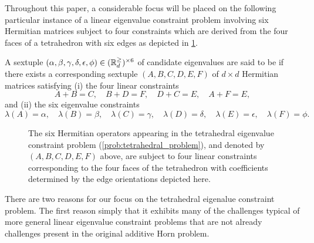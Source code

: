 \documentclass[notitlepage, 10pt]{article}
\begin{document}
Throughout this paper, a considerable focus will be placed on the following particular instance of a linear eigenvalue constraint problem involving six Hermitian matrices subject to four constraints which are derived from the four faces of a tetrahedron with six edges as depicted in \cref{fig:tetrahedron_labelling_scheme}.
\begin{prob}
    \label{prob:tetrahedral_problem}
    A sextuple $(\alpha,\beta,\gamma,\delta,\epsilon,\phi) \in (\mathbb R^{\geq}_{d})^{\times 6}$ of candidate eigenvalues are said to be  if there exists a corresponding sextuple $(A,B,C,D,E,F)$ of $d\times d$ Hermitian matrices satisfying (i) the four linear constraints
    \begin{equation}
        \label{eq:tetrahedral_linear_constraints}
        A + B = C, \quad
        B + D = F, \quad
        D + C = E, \quad
        A + F = E,
    \end{equation}
    and (ii) the six eigenvalue constraints
    \begin{equation}
        \label{eq:tetrahedral_eigenvalue_constraints}
        \lambda(A) = \alpha, \quad
        \lambda(B) = \beta, \quad
        \lambda(C) = \gamma, \quad
        \lambda(D) = \delta, \quad
        \lambda(E) = \epsilon, \quad
        \lambda(F) = \phi.
    \end{equation}
\end{prob}
\begin{center}
    \begin{figure}
        \caption{The six Hermitian operators appearing in the tetrahedral eigenvalue constraint problem (\cref{prob:tetrahedral_problem}), and denoted by $(A,B,C,D,E,F)$ above, are subject to four linear constraints corresponding to the four faces of the tetrahedron with coefficients determined by the edge orientations depicted here.}
        \label{fig:tetrahedron_labelling_scheme}
    \end{figure}
\end{center}
There are two reasons for our focus on the tetrahedral eigenalue constraint problem.
The first reason simply that it exhibits many of the challenges typical of more general linear eigenvalue constraint problems that are not already challenges present in the original additive Horn problem.
\end{document}

